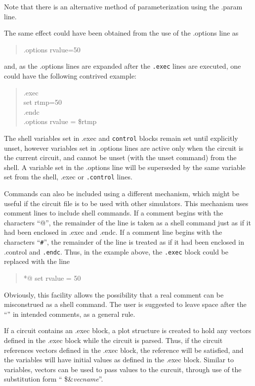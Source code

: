 Note that there is an alternative method of parameterization using
the {\vt .param} line.

The same effect could have been obtained from the use of the
{\vt .options} line as
\begin{quote}\vt
.options rvalue=50
\end{quote}
and, as the {\vt .options} lines are expanded after the {\tt .exec} lines
are executed, one could have the following contrived example:
\begin{quote}\vt
.exec\\
set rtmp=50\\
.endc\\
.options rvalue = \$rtmp\\
\end{quote}
The shell variables set in {\vt .exec} and {\tt control} blocks remain
set until explicitly unset, however variables set in {\vt .options}
lines are active only when the circuit is the current circuit, and cannot
be unset (with the {\cb unset} command) from the shell.  A variable set
in the {\vt .options} line will be superseded by the same variable
set from the shell, {\vt .exec} or {\tt .control} lines.

Commands can also be included using a different mechanism, which might
be useful if the circuit file is to be used with other simulators.  This
mechanism uses comment lines to include shell commands.  If a comment
begins with the characters ``{\vt *@}'', the remainder of the line is
taken as a shell command just as if it had been enclosed in {\vt .exec}
and {\vt .endc}.  If a comment line begins with the characters ``{\tt *\#}'',
the remainder of the line is treated as if it had been enclosed in
{\vt .control} and {\tt .endc}.  Thus, in the example above, the {\tt .exec}
block could be replaced with the line
\begin{quote}\vt
*@ set rvalue = 50
\end{quote}
Obviously, this facility allows the possibility that a real comment
can be misconstrued as a shell command.  The user is suggested to
leave space after the ``{\vt *}'' in intended comments, as a general
rule.

If a circuit contains an {\vt .exec} block, a plot structure is
created to hold any vectors defined in the {\vt .exec} block while the
circuit is parsed.  Thus, if the circuit references vectors defined in
the {\vt .exec} block, the reference will be satisfied, and the
variables will have initial values as defined in the {\vt .exec}
block.  Similar to variables, vectors can be used to pass values to
the curcuit, through use of the substitution form ``{\vt
\$\&}{\it vecname}''.


